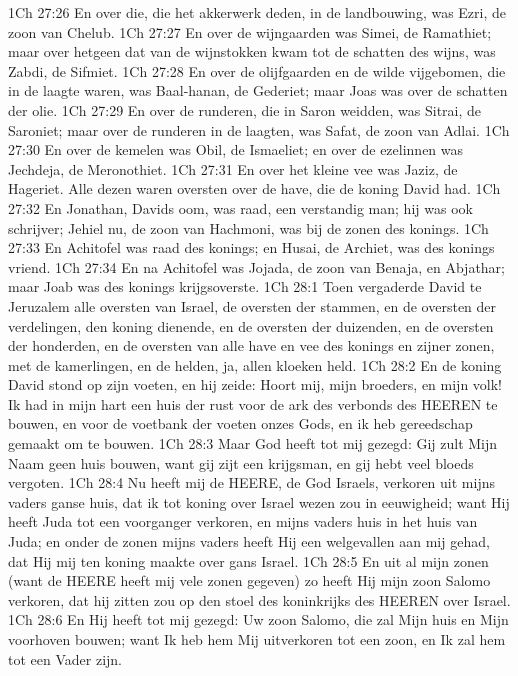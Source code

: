 1Ch 27:26  En over die, die het akkerwerk deden, in de landbouwing, was Ezri, de zoon van Chelub.
1Ch 27:27  En over de wijngaarden was Simei, de Ramathiet; maar over hetgeen dat van de wijnstokken kwam tot de schatten des wijns, was Zabdi, de Sifmiet.
1Ch 27:28  En over de olijfgaarden en de wilde vijgebomen, die in de laagte waren, was Baal-hanan, de Gederiet; maar Joas was over de schatten der olie.
1Ch 27:29  En over de runderen, die in Saron weidden, was Sitrai, de Saroniet; maar over de runderen in de laagten, was Safat, de zoon van Adlai.
1Ch 27:30  En over de kemelen was Obil, de Ismaeliet; en over de ezelinnen was Jechdeja, de Meronothiet.
1Ch 27:31  En over het kleine vee was Jaziz, de Hageriet. Alle dezen waren oversten over de have, die de koning David had.
1Ch 27:32  En Jonathan, Davids oom, was raad, een verstandig man; hij was ook schrijver; Jehiel nu, de zoon van Hachmoni, was bij de zonen des konings.
1Ch 27:33  En Achitofel was raad des konings; en Husai, de Archiet, was des konings vriend.
1Ch 27:34  En na Achitofel was Jojada, de zoon van Benaja, en Abjathar; maar Joab was des konings krijgsoverste.
1Ch 28:1  Toen vergaderde David te Jeruzalem alle oversten van Israel, de oversten der stammen, en de oversten der verdelingen, den koning dienende, en de oversten der duizenden, en de oversten der honderden, en de oversten van alle have en vee des konings en zijner zonen, met de kamerlingen, en de helden, ja, allen kloeken held.
1Ch 28:2  En de koning David stond op zijn voeten, en hij zeide: Hoort mij, mijn broeders, en mijn volk! Ik had in mijn hart een huis der rust voor de ark des verbonds des HEEREN te bouwen, en voor de voetbank der voeten onzes Gods, en ik heb gereedschap gemaakt om te bouwen.
1Ch 28:3  Maar God heeft tot mij gezegd: Gij zult Mijn Naam geen huis bouwen, want gij zijt een krijgsman, en gij hebt veel bloeds vergoten.
1Ch 28:4  Nu heeft mij de HEERE, de God Israels, verkoren uit mijns vaders ganse huis, dat ik tot koning over Israel wezen zou in eeuwigheid; want Hij heeft Juda tot een voorganger verkoren, en mijns vaders huis in het huis van Juda; en onder de zonen mijns vaders heeft Hij een welgevallen aan mij gehad, dat Hij mij ten koning maakte over gans Israel.
1Ch 28:5  En uit al mijn zonen (want de HEERE heeft mij vele zonen gegeven) zo heeft Hij mijn zoon Salomo verkoren, dat hij zitten zou op den stoel des koninkrijks des HEEREN over Israel.
1Ch 28:6  En Hij heeft tot mij gezegd: Uw zoon Salomo, die zal Mijn huis en Mijn voorhoven bouwen; want Ik heb hem Mij uitverkoren tot een zoon, en Ik zal hem tot een Vader zijn.
